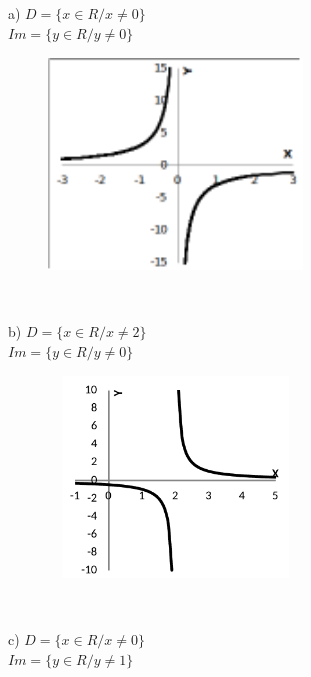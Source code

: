 \begin{respostas}{3}

	\ansitem{} a) \( D= \{ x \in R/x \neq 0 \}  \) \\ \( Im= \{ y \in R/y \neq 0 \}  \) 


	\begin{figure}[H]
		\begin{Center}
			\includegraphics[width=2.66in,height=2.22in]{capitulos/outras_funcoes/media/image40.pdf}
		\end{Center}
	\end{figure}

~~

	b)  \( D= \{ x \in R/x \neq 2 \}  \) \\ \( Im= \{ y \in R/y \neq 0 \}  \) 

	\begin{figure}[H]
		\begin{Center}
			\includegraphics[width=2.66in,height=2.11in]{capitulos/outras_funcoes/media/image41.pdf}
		\end{Center}
	\end{figure}

~~

	c) \( D= \{ x \in R/x \neq 0 \}  \) \\ \( Im= \{ y \in R/y \neq 1 \}  \)


\end{respostas}
